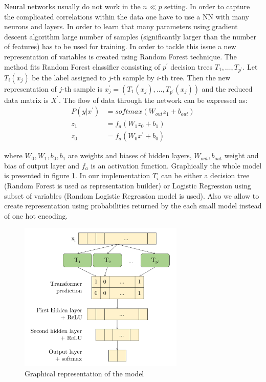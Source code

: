 \documentclass[shortabstract, english, mgr]{iithesis}
\begin{document}
Neural networks usually do not work in the $n \ll p$ setting. In order to capture the complicated correlations within the data one have to use a NN with many neurons and layers. In order to learn that many parameters using gradient descent algorithm large number of samples (significantly larger than the number of features) has to be used for training. In order to tackle this issue a new representation of variables is created using Random Forest technique. The method fits Random Forest classifier consisting of $p^{\prime}$ decision trees $T_1, \ldots, T_{p^{\prime}}$. Let $T_i(x_j)$ be the label assigned to $j$-th sample by $i$-th tree. Then the new representation of $j$-th sample is $x_j^{\prime} = \left(T_1(x_j), \ldots, T_{p^{\prime}}(x_j)\right)$ and the reduced data matrix is $X^{\prime}$. The flow of data through the network can be expressed as:
\begin{align*} 
P(y | x^{\prime}) &= softmax\left(W_{out}z_1+b_{out}\right) \\ 
z_{1} &=f_a\left(W_1z_0+b_1\right) \\ 
z_{0} &=f_a\left(W_0x^{\prime} +b_0\right) 
\end{align*}

where $W_0, W_1, b_0, b_1$ are weights and biases of hidden layers, $W_{out}, b_{out}$ weight and bias of output layer and $f_a$ is an activation function. Graphically the whole model is presented in figure \ref{fig:fDNN}. In our implementation $T_i$ can be either a decision tree (Random Forest is used as representation builder) or Logistic Regression using subset of variables (Random Logistic Regression model is used). Also we allow to create representation using probabilities returned by the each small model instead of one hot encoding.

\begin{figure}
\centering
\includegraphics[width=0.7\textwidth]{images/FDNN.png}
\caption{Graphical representation of the model}
\label{fig:fDNN}
\end{figure}
\end{document}
